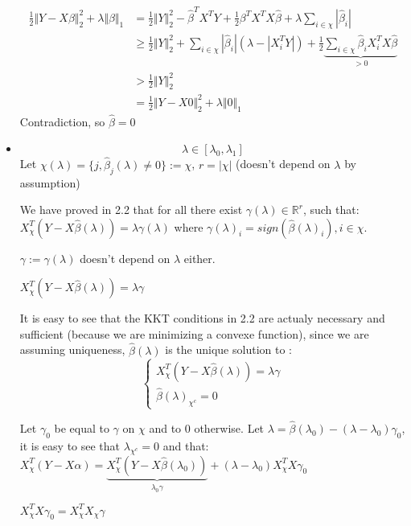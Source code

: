 \documentclass[12pt]{article}
\newcommand{\norm}[1]{\Vert #1 \Vert}
\begin{document}
\begin{itemize}
  
  \begin{align*}
    \frac12 \norm{Y - X\beta}_2^2 + \lambda \norm{\beta}_1
    &= \frac12 \norm{Y}_2^2 - \hat \beta^TX^TY + \frac12 \beta^T X^TX \hat \beta +  \lambda \sum_{i \in \chi} |\hat \beta_i|
    \\&\ge \frac12 \norm{Y}_2^2 + \sum_{i \in \chi} |\hat \beta_i| (\lambda - |X_i^TY|)
        + \frac12  \underbrace{\sum_{i \in \chi} \hat\beta_i X_i^TX\hat \beta}_{> 0}
    \\&> \frac12 \norm{Y}_2^2
    \\&= \frac12 \norm{Y - X0}_2^2 + \lambda\norm{0}_1
  \end{align*}
  Contradiction, so $\hat \beta = 0$
\item
  $$\lambda \in [\lambda_0, \lambda_1]$$
  Let $\chi(\lambda) = \{ j, \hat \beta_j(\lambda) \ne 0 \} := \chi$, $r = |\chi|$ (doesn't depend on $\lambda$ by assumption)

  We have proved in 2.2 that for all there exist $\gamma(\lambda) \in \mathbb R^r$, such that:
  $X_{\chi}^T(Y - X\hat \beta(\lambda)) = \lambda \gamma(\lambda) $ where  $\gamma(\lambda)_i = sign(\hat \beta(\lambda)_i), i \in \chi$.

  $\gamma := \gamma(\lambda)$ doesn't depend on $\lambda$ either.

  $X_{\chi}^T(Y - X\hat \beta(\lambda)) =  \lambda \gamma$

  It is easy to see that the KKT conditions in 2.2 are actualy necessary and sufficient (because we are minimizing a convexe function), since we are assuming uniqueness, $\hat \beta(\lambda)$ is the unique solution to :
  \begin{equation}
    \left\{
      \begin{array}{c}
        X_{\chi}^T(Y - X\hat \beta(\lambda)) =  \lambda \gamma\\
        \hat \beta(\lambda)_{\chi^c} = 0
      \end{array}
    \right.
  \end{equation}

  Let $\gamma_0$ be equal to $\gamma$ on $\chi$ and to 0 otherwise.
  Let $\lambda = \hat \beta(\lambda_0) - (\lambda - \lambda_0) \gamma_0$, it is easy to see that $\lambda_{\chi^c} = 0$ and that:
  $X_{\chi}^T(Y - X\alpha) = \underbrace{X_{\chi}^T(Y - X\hat \beta(\lambda_0))}_{\lambda_0 \gamma} + (\lambda - \lambda_0) X_{\chi}^T X \gamma_0$

  $X_{\chi}^T X \gamma_0 = X_{\chi}^T X_{\chi} \gamma$
\end{itemize}
\end{document}
